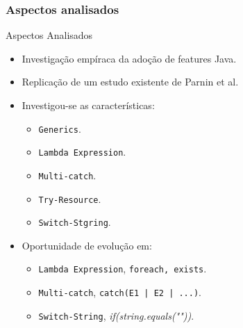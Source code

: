 \documentclass[]{beamer}
\begin{document}
		
	\begin{frame}[label=AspectosAnalisados]
		\frametitle{Aspectos analisados}
		\begin{block}{Aspectos Analisados}
			\begin{itemize}
				\item Investigação empíraca da adoção de features Java.
				
				\item Replicação de um estudo existente de Parnin et al.
				
				\item Investigou-se as características:
					\begin{itemize}
						\item \texttt{Generics}.
						\item \texttt{Lambda Expression}.
						\item \texttt{Multi-catch}.
						\item \texttt{Try-Resource}.
						\item \texttt{Switch-Stgring}.
					\end{itemize}

				\item Oportunidade de evolução em:
					\begin{itemize}
						\item \texttt{Lambda Expression}, \texttt{foreach, exists}.
						\item \texttt{Multi-catch}, \texttt{catch(E1 | E2 | ...)}.
						\item \texttt{Switch-String}, \textit{if(string.equals(""))}.
					\end{itemize}

			\end{itemize}
		\end{block}
	\end{frame}
	

	

	
%			
\end{document}
